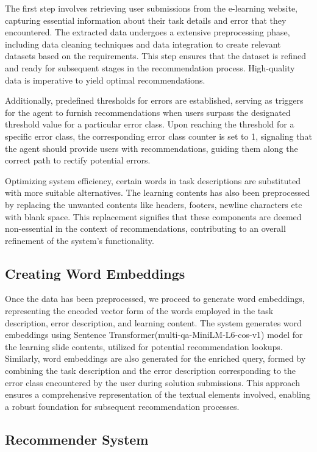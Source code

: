\documentclass[conference]{IEEEtran}
\begin{document}
{{The first step involves retrieving user submissions from the e-learning website, capturing essential information about their task details and error that they encountered. The extracted data undergoes a extensive preprocessing phase, including data cleaning techniques and data integration to create relevant datasets based on the requirements. This step ensures that the dataset is refined and ready for subsequent stages in the recommendation process. High-quality data is imperative to yield optimal recommendations. 

Additionally, predefined thresholds for errors are established, serving as triggers for the agent to furnish recommendations when users surpass the designated threshold value for a particular error class. Upon reaching the threshold for a specific error class, the corresponding error class counter is set to 1, signaling that the agent should provide users with recommendations, guiding them along the correct path to rectify potential errors.

Optimizing system efficiency, certain words in task descriptions are substituted with more suitable alternatives. The learning contents has also been preprocessed by replacing the unwanted contents like headers, footers, newline characters etc with blank space. This replacement signifies that these components are deemed non-essential in the context of recommendations, contributing to an overall refinement of the system's functionality.

\subsection{Creating Word Embeddings} 

Once the data has been preprocessed, we proceed to generate word embeddings, representing the encoded vector form of the words employed in the task description, error description, and learning content. The system generates word embeddings using Sentence Transformer(multi-qa-MiniLM-L6-cos-v1) model for the learning slide contents, utilized for potential recommendation lookups. Similarly, word embeddings are also generated for the enriched query, formed by combining the task description and the error description corresponding to the error class encountered by the user during solution submissions. This approach ensures a comprehensive representation of the textual elements involved, enabling a robust foundation for subsequent recommendation processes.

\subsection{Recommender System}

}}
\end{document}
